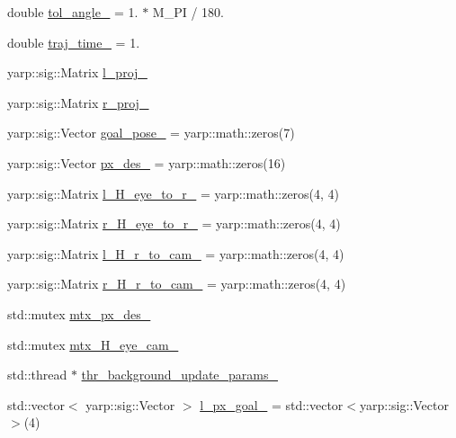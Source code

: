 \begin{DoxyCompactItemize}
\item 
double \hyperlink{classVisualServoingServer_a8a39a62f89dc07cbfbdc91441ad71975}{tol\+\_\+angle\+\_\+} = 1. $\ast$ M\+\_\+\+PI / 180.
\item 
double \hyperlink{classVisualServoingServer_ac397cdbba97a35d454ab2974db0c5005}{traj\+\_\+time\+\_\+} = 1.
\item 
yarp\+::sig\+::\+Matrix \hyperlink{classVisualServoingServer_a19525066e8d98f781f28600ff526ce68}{l\+\_\+proj\+\_\+}
\item 
yarp\+::sig\+::\+Matrix \hyperlink{classVisualServoingServer_a5bd4d326f2247a39065747e937246677}{r\+\_\+proj\+\_\+}
\item 
yarp\+::sig\+::\+Vector \hyperlink{classVisualServoingServer_aadfea10f7ca8a2e745c4091d2a1b7c46}{goal\+\_\+pose\+\_\+} = yarp\+::math\+::zeros(7)
\item 
yarp\+::sig\+::\+Vector \hyperlink{classVisualServoingServer_a26d45260d6b8e1e17c57bf339890c124}{px\+\_\+des\+\_\+} = yarp\+::math\+::zeros(16)
\item 
yarp\+::sig\+::\+Matrix \hyperlink{classVisualServoingServer_afbf7be0f4c935dcbcd8a23b07b7972ba}{l\+\_\+\+H\+\_\+eye\+\_\+to\+\_\+r\+\_\+} = yarp\+::math\+::zeros(4, 4)
\item 
yarp\+::sig\+::\+Matrix \hyperlink{classVisualServoingServer_a5de06681532722dae98703c4d3e60ba1}{r\+\_\+\+H\+\_\+eye\+\_\+to\+\_\+r\+\_\+} = yarp\+::math\+::zeros(4, 4)
\item 
yarp\+::sig\+::\+Matrix \hyperlink{classVisualServoingServer_a43b53260b0903efb5479becf664f33ae}{l\+\_\+\+H\+\_\+r\+\_\+to\+\_\+cam\+\_\+} = yarp\+::math\+::zeros(4, 4)
\item 
yarp\+::sig\+::\+Matrix \hyperlink{classVisualServoingServer_a82bdf1e87c5f65bbbea97655a78fceb6}{r\+\_\+\+H\+\_\+r\+\_\+to\+\_\+cam\+\_\+} = yarp\+::math\+::zeros(4, 4)
\item 
std\+::mutex \hyperlink{classVisualServoingServer_a63758b38bb0069515d047449aafc9597}{mtx\+\_\+px\+\_\+des\+\_\+}
\item 
std\+::mutex \hyperlink{classVisualServoingServer_a379f8205d854495f481bbaa37825dfcb}{mtx\+\_\+\+H\+\_\+eye\+\_\+cam\+\_\+}
\item 
std\+::thread $\ast$ \hyperlink{classVisualServoingServer_a01078c56ef8966f186d5cbf22c8c1c0c}{thr\+\_\+background\+\_\+update\+\_\+params\+\_\+}
\item 
std\+::vector$<$ yarp\+::sig\+::\+Vector $>$ \hyperlink{classVisualServoingServer_a3f7efc9e5a4bbb030a4dd81030643398}{l\+\_\+px\+\_\+goal\+\_\+} = std\+::vector$<$yarp\+::sig\+::\+Vector$>$(4)

\end{DoxyCompactItemize}
